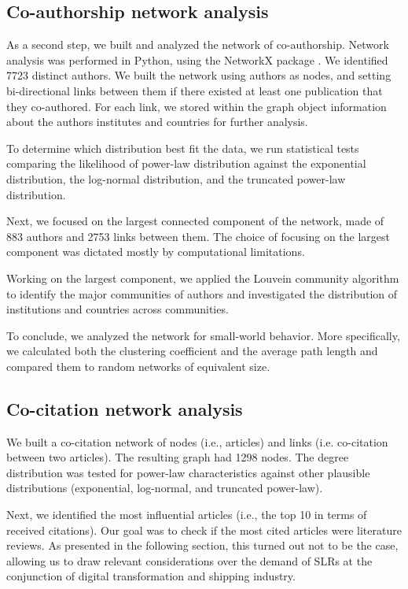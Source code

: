\documentclass[a4paper, review, endfloat, doubleblind, authoryear]{elsarticle}
\begin{document}
	\subsection{Co-authorship network analysis}
	As a second step, we built and analyzed the network of co-authorship. Network analysis was performed in Python, using the NetworkX package \citep{hagberg2008exploring}. We identified 7723 distinct authors. We built the network using authors as nodes, and setting bi-directional links between them if there existed at least one publication that they co-authored. For each link, we stored within the graph object information about the authors institutes and countries for further analysis.
	
	To determine which distribution best fit the data, we run statistical tests comparing the likelihood of power-law distribution against the exponential distribution, the log-normal distribution, and the truncated power-law distribution.
	
	Next, we focused on the largest connected component of the network, made of 883 authors and 2753 links between them. The choice of focusing on the largest component was dictated mostly by computational limitations.
	
	Working on the largest component, we applied the Louvein community \citep{blondel2008fast} algorithm to identify the major communities of authors and investigated the distribution of institutions and countries across communities.
	
	To conclude, we analyzed the network for small-world behavior. More specifically, we calculated both the clustering coefficient and the average path length and compared them to random networks of equivalent size.
	
	\subsection{Co-citation network analysis}
	We built a co-citation network of nodes (i.e., articles) and links (i.e. co-citation between two articles). The resulting graph had 1298 nodes. The degree distribution was tested for power-law characteristics against other plausible distributions (exponential, log-normal, and truncated power-law).
	
	Next, we identified the most influential articles (i.e., the top 10 in terms of received citations). Our goal was to check if the most cited articles were literature reviews. As presented in the following section, this turned out not to be the case, allowing us to draw relevant considerations over the demand of SLRs at the conjunction of digital transformation and shipping industry.
	
\end{document}
